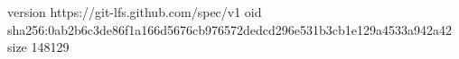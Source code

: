 version https://git-lfs.github.com/spec/v1
oid sha256:0ab2b6c3de86f1a166d5676cb976572dedcd296e531b3cb1e129a4533a942a42
size 148129
